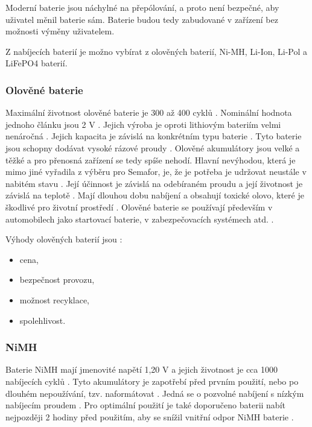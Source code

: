 Moderní baterie jsou náchylné na přepólování, a proto není bezpečné, aby uživatel měnil baterie sám. Baterie budou tedy zabudované v zařízení bez možnosti 
výměny uživatelem. 


Z nabíjecích baterií je možno vybírat z olověných baterií, Ni-MH, Li-Ion, Li-Pol a LiFePO4 baterií.

\subsubsection{Olověné baterie}
Maximální životnost olověné baterie je 300 až 400 cyklů \cite{LiFePO4_malina}. Nominální hodnota jednoho článku jsou 2 V \cite{olovene}. Jejich výroba je oproti
lithiovým bateriím velmi nenáročná \cite{olovene}. Jejich kapacita je závislá na konkrétním typu baterie \cite{olovene}. Tyto baterie jsou schopny dodávat vysoké
rázové proudy \cite{akumulatory}. Olověné akumulátory jsou velké a těžké a pro přenosná zařízení se tedy spíše nehodí. Hlavní nevýhodou, která je mimo jiné vyřadila 
z výběru pro Semafor, je, že je potřeba je udržovat neustále v nabitém stavu \cite{olovene}. Její účinnost je závislá na odebíraném proudu a její životnost je závislá 
na teplotě \cite{olovene}. Mají dlouhou dobu nabíjení a obsahují toxické olovo, které je škodlivé pro životní prostředí \cite{olovene}. Olověné baterie se používají 
především v automobilech jako startovací baterie, v zabezpečovacích systémech atd. \cite{olovene}.

Výhody olověných baterií jsou \cite{olovene}:
\begin{itemize}
  \item cena,
  \item bezpečnost provozu,
  \item možnost recyklace,
  \item spolehlivost. 
\end{itemize}

\subsubsection{NiMH}
Baterie NiMH mají jmenovité napětí 1,20 V a jejich životnost je cca 1000 nabíjecích cyklů \cite{akumulatory}. Tyto akumulátory je zapotřebí před prvním použití, nebo po 
dlouhém nepoužívání, tzv. naformátovat \cite{akumulatory}. 
Jedná se o pozvolné nabíjení s nízkým nabíjecím proudem \cite{akumulatory}. Pro optimální použití je také doporučeno baterii nabít nejpozději 2 hodiny před použitím, aby se 
snížil vnitřní odpor NiMH baterie \cite{akumulatory}.

